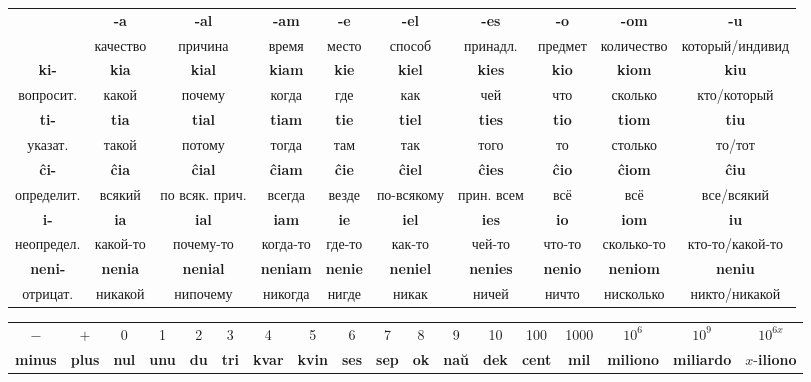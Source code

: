 \documentclass{article}
\def\b#1{\textbf{#1}}
\begin{document}
\vspace{1em}
\begin{tabular}{|c|c|c|c|c|c|c|c|c|c|}
\hline
 & \b{-a} & \b{-al} & \b{-am} & \b{-e} & \b{-el} & \b{-es} & \b{-o} & \b{-om} & \b{-u} \\
& качество & причина & время & место & способ & принадл. & предмет & количество & который/индивид \\
\hline
\b{ki-} & \b{kia} & \b{kial} & \b{kiam} & \b{kie} & \b{kiel} & \b{kies} & \b{kio} & \b{kiom} & \b{kiu} \\
вопросит. & какой & почему & когда & где & как & чей & что & сколько & кто/который \\
\hline
\b{ti-} & \b{tia} & \b{tial} & \b{tiam} & \b{tie} & \b{tiel} & \b{ties} & \b{tio} & \b{tiom} & \b{tiu} \\
указат. & такой & потому & тогда & там & так & того & то & столько & то/тот \\
\hline
\b{ĉi-} & \b{ĉia} & \b{ĉial} & \b{ĉiam} & \b{ĉie} & \b{ĉiel} & \b{ĉies} & \b{ĉio} & \b{ĉiom} & \b{ĉiu} \\
определит. & всякий & по всяк. прич. & всегда & везде & по-всякому & прин. всем & всё & всё & все/всякий \\
\hline
\b{i-} & \b{ia} & \b{ial} & \b{iam} & \b{ie} & \b{iel} & \b{ies} & \b{io} & \b{iom} & \b{iu} \\
неопредел. & какой-то & почему-то & когда-то & где-то & как-то & чей-то & что-то & сколько-то & кто-то/какой-то \\
\hline
\b{neni-} & \b{nenia} & \b{nenial} & \b{neniam} & \b{nenie} & \b{neniel} & \b{nenies} & \b{nenio} & \b{neniom} & \b{neniu} \\
отрицат. & никакой & нипочему & никогда & нигде & никак & ничей & ничто & нисколько & никто/никакой \\
\hline
\end{tabular}

\vspace{1em}
\begin{tabular}{|c|c|c|c|c|c|c|c|c|c|c|c|c|c|c|c|c|c|}
\hline
$-$ & $+$ & 0 & 1 & 2 & 3 & 4 & 5 & 6 & 7 & 8 & 9 & 10 & 100 & 1000 & $10^6$ & $10^9$ & $10^{6x}$ \\
\b{minus} & \b{plus} & \b{nul} & \b{unu} & \b{du} & \b{tri} & \b{kvar} & \b{kvin} & \b{ses} & \b{sep} & \b{ok} & \b{naŭ} & \b{dek} & \b{cent} & \b{mil} & \b{miliono} & \b{miliardo} & $x$-\b{iliono} \\
\hline
\end{tabular}
\end{document}
